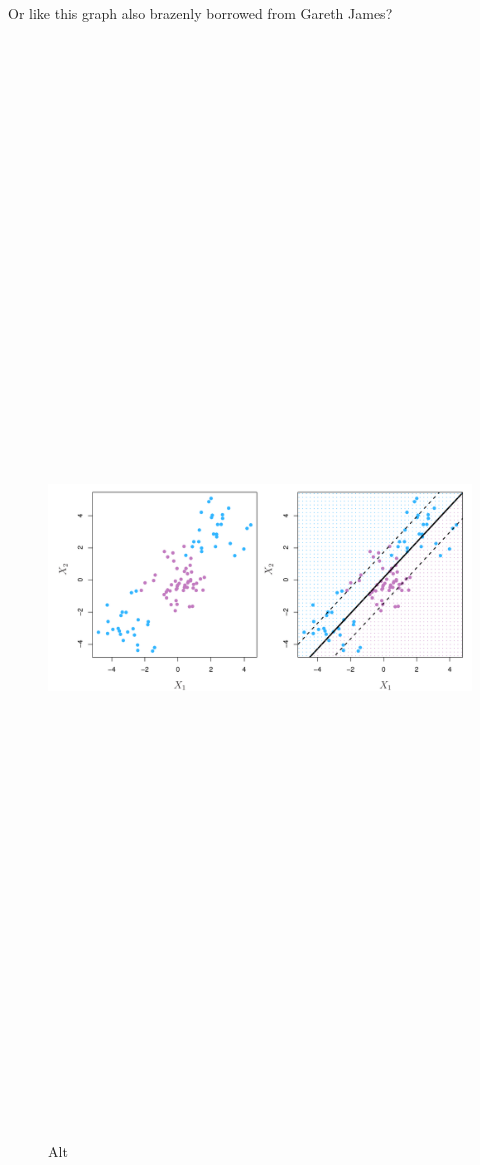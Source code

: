 \documentclass[
]{article}
\begin{document}
Or like this graph also brazenly borrowed from Gareth James?

\begin{figure}
\centering
\includegraphics[width=1\textwidth,height=12.5in]{9.8.pdf}
\caption{Alt}
\end{figure}
\end{document}
